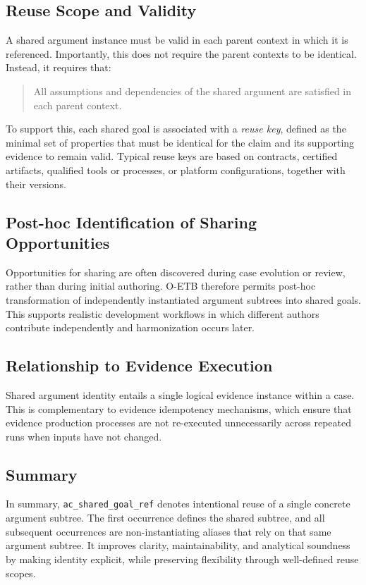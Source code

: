 \documentclass[12pt,twoside,a4paper]{article}
\begin{document}
\subsection{Reuse Scope and Validity}

A shared argument instance must be valid in each parent context in which it is referenced. Importantly, this does not require the parent contexts to be identical. Instead, it requires that:

\begin{quote}
All assumptions and dependencies of the shared argument are satisfied in each parent context.
\end{quote}

To support this, each shared goal is associated with a \emph{reuse key}, defined as the minimal set of properties that must be identical for the claim and its supporting evidence to remain valid. Typical reuse keys are based on contracts, certified artifacts, qualified tools or processes, or platform configurations, together with their versions.

\subsection{Post-hoc Identification of Sharing Opportunities}

Opportunities for sharing are often discovered during case evolution or review, rather than during initial authoring. O-ETB therefore permits post-hoc transformation of independently instantiated argument subtrees into shared goals. This supports realistic development workflows in which different authors contribute independently and harmonization occurs later.

\subsection{Relationship to Evidence Execution}

Shared argument identity entails a single logical evidence instance within a case. This is complementary to evidence idempotency mechanisms, which ensure that evidence production processes are not re-executed unnecessarily across repeated runs when inputs have not changed.

\subsection{Summary}

In summary, \texttt{ac\_shared\_goal\_ref}
denotes intentional reuse of a single concrete argument subtree.
The first occurrence defines the shared subtree, and all subsequent occurrences are non-instantiating aliases that rely on that same argument subtree.
It improves clarity, maintainability, and analytical soundness by making identity explicit, while preserving flexibility through well-defined reuse scopes.
\end{document}
